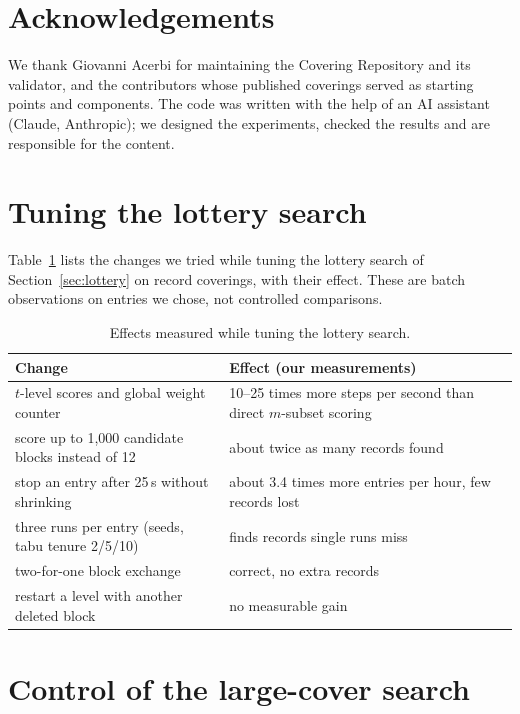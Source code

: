 \documentclass[11pt]{article}
\theoremstyle{remark}
\begin{document}
\section*{Acknowledgements}

We thank Giovanni Acerbi for maintaining the Covering Repository and its validator, and the contributors whose
published coverings served as starting points and components. The code was written with the help of an AI assistant
(Claude, Anthropic); we designed the experiments, checked the results and are responsible for the content.

\appendix

\section{Tuning the lottery search}\label{app:tuning}

Table~\ref{tab:tuning} lists the changes we tried while tuning the lottery search of Section~\ref{sec:lottery} on
record coverings, with their effect. These are batch observations on entries we chose, not controlled comparisons.

\begin{table}[H]
\centering
\begin{tabular}{p{7.2cm}p{6.6cm}}
\toprule
Change & Effect (our measurements) \\
\midrule
$t$-level scores and global weight counter & 10--25 times more steps per second than direct $m$-subset scoring \\
score up to 1{,}000 candidate blocks instead of 12 & about twice as many records found \\
stop an entry after 25\,s without shrinking & about 3.4 times more entries per hour, few records lost \\
three runs per entry (seeds, tabu tenure 2/5/10) & finds records single runs miss \\
two-for-one block exchange & correct, no extra records \\
restart a level with another deleted block & no measurable gain \\
\bottomrule
\end{tabular}
\caption{Effects measured while tuning the lottery search.}
\label{tab:tuning}
\end{table}

\section{Control of the large-cover search}\label{app:big}
\end{document}
